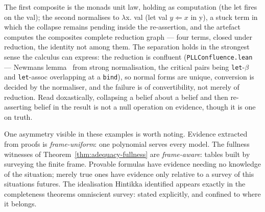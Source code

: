 The first composite is the monad\textquotesingle s unit law, holding as computation
(the let fires on the val); the second normalises to
\ensuremath{\lambda}x. val (let val \ensuremath{y \Leftarrow x} in y), a stuck term in which the collapse
remains pending inside the re-assertion, and the artefact computes the
composite\textquotesingle s complete reduction graph --- four terms, closed under
reduction, the identity not among them. The separation holds in the
strongest sense the calculus can express: the reduction is confluent
(\texttt{PLLConfluence.lean} --- Newman\textquotesingle s lemma~\cite{Newman1942} from
strong normalisation, the critical pairs being \texttt{let}-\ensuremath{\beta} and
\texttt{let}-assoc overlapping at a \texttt{bind}), so normal forms are
unique, conversion is decided by the normaliser, and the failure is of
convertibility, not merely of reduction. Read doxastically, collapsing
a belief about a belief and then re-asserting belief in the result is
not a null operation on evidence, though it is one on truth.

One asymmetry visible in these examples is worth noting.
Evidence extracted from proofs is \emph{frame-uniform}: one polynomial
serves every model. The fullness witnesses of
Theorem~\ref{thm:adequacy-fullness} are
\emph{frame-aware}: tables built by surveying the finite frame. Provable
formulas have evidence needing no knowledge of the situation; merely
true ones have evidence only relative to a survey of this situation\textquotesingle s
futures. The idealisation Hintikka identified appears exactly in the
completeness theorem\textquotesingle s omniscient survey: stated explicitly, and confined to
where it belongs.

